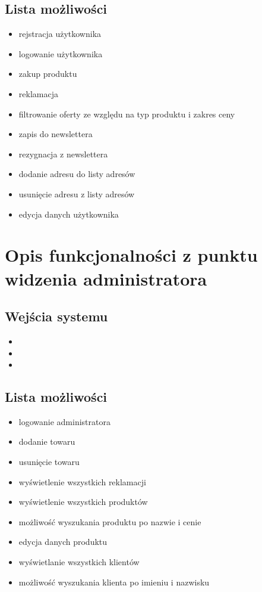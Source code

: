\documentclass[12pt]{report}
\begin{document}
	
	\subsection{Lista możliwości}
		\begin{itemize}
			\item rejstracja użytkownika
			\item logowanie użytkownika
			\item zakup produktu
			\item reklamacja
			\item filtrowanie oferty ze względu na typ produktu i zakres ceny
			\item zapis do newslettera
			\item rezygnacja z newslettera
			\item dodanie adresu do listy adresów
			\item usunięcie adresu z listy adresów
			\item edycja danych użytkownika
		\end{itemize}


	\section{Opis funkcjonalności z punktu widzenia administratora}

	\subsection{Wejścia systemu}
		\begin{itemize}
			\item 
			\item 
			\item
		\end{itemize}
	
	
	\subsection{Lista możliwości}
	\begin{itemize}
		\item logowanie administratora
		\item dodanie towaru
		\item usunięcie towaru
		\item wyświetlenie wszystkich reklamacji
		\item wyświetlenie wszystkich produktów
		\item możliwość wyszukania produktu po nazwie i cenie
		\item edycja danych produktu
		\item wyświetlanie wszystkich klientów
		\item możliwość wyszukania klienta po imieniu i nazwisku
	\end{itemize}
\end{document}
